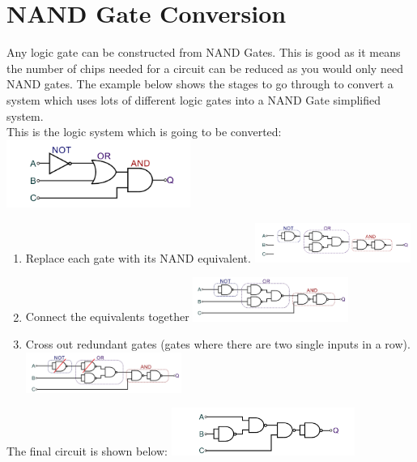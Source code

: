 \documentclass[a4paper,11pt, twocolumn]{article}
\begin{document}
\section{NAND Gate Conversion}
Any logic gate can be constructed from NAND Gates. This is good as it means the number of chips needed for a circuit can be reduced as you would only need NAND gates. 
The example below shows the stages to go through to convert a system which uses lots of different logic gates into a NAND Gate simplified system.\\
This is the logic system which is going to be converted:\\
\includegraphics[width=0.45\textwidth]{nand input.PNG}\\
\begin{enumerate}
    \item Replace each gate with its NAND equivalent.
    \includegraphics[width=0.4\textwidth]{nand s1.PNG}\\
    \item Connect the equivalents together
    \includegraphics[width=0.4\textwidth]{nand s2.PNG}\\
    \item Cross out redundant gates (gates where there are two single inputs in a row).
    \includegraphics[width=0.4\textwidth]{nand double.PNG}\\
\end{enumerate}
The final circuit is shown below:
\includegraphics[width=0.45\textwidth]{nand final.PNG}
\end{document}

